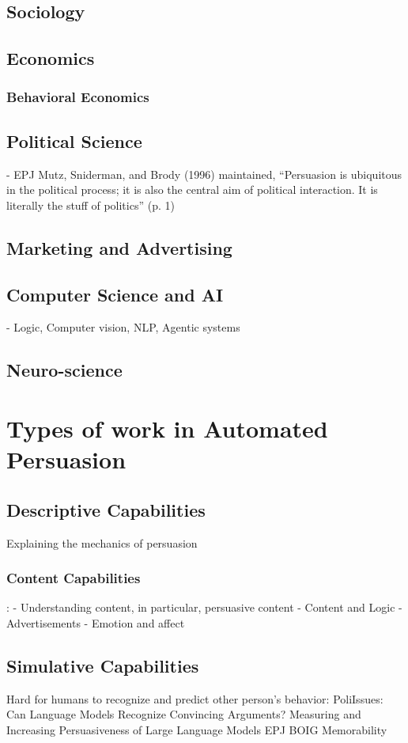 \documentclass{article} %
\begin{document}
    \subsection{Sociology}
    \subsection{Economics}
    \subsubsection{Behavioral Economics}
    \subsection{Political Science}
        - EPJ
        Mutz, Sniderman, and Brody (1996) maintained, “Persuasion is ubiquitous in the political process; it is also the central aim of political interaction. It is literally the stuff of politics” (p. 1)
    \subsection{Marketing and Advertising}
    \subsection{Computer Science and AI}
        - Logic, Computer vision, NLP, Agentic systems
    \subsection{Neuro-science}

\section{Types of work in Automated Persuasion}
    \subsection{Descriptive Capabilities}
        Explaining the mechanics of persuasion

        \subsubsection{Content Capabilities}:
        - Understanding content, in particular, persuasive content
            - Content and Logic
            - Advertisements
            - Emotion and affect
    
    \subsection{Simulative Capabilities}
        Hard for humans to recognize and predict other person's behavior:
            PoliIssues: Can Language Models Recognize Convincing Arguments?
            Measuring and Increasing Persuasiveness of Large Language Models
            EPJ
            BOIG
            Memorability
            
\end{document}
